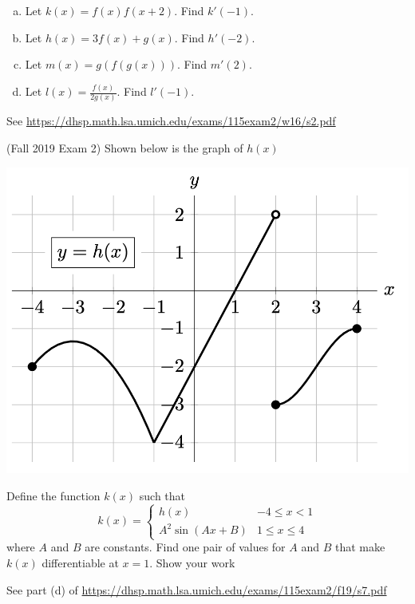 \documentclass[11pt]{exam}
\begin{document}
\begin{questions}
\begin{multicols}{2}
\begin{enumerate}[(a)]
	\item Let $k(x) = f(x)f(x+2)$. Find $k'(-1)$.
	\item Let $h(x) = 3f(x) + g(x)$. Find $h'(-2)$.
	\item Let $m(x) = g(f(g(x)))$. Find $m'(2)$.
	\item Let $l(x) = \frac{f(x)}{2g(x)}$. Find $l'(-1)$.
	\end{enumerate}
	\end{multicols}
        \begin{solution}
          See \href{https://dhsp.math.lsa.umich.edu/exams/115exam2/w16/s2.pdf}{https://dhsp.math.lsa.umich.edu/exams/115exam2/w16/s2.pdf}
        \end{solution}
      \question (Fall 2019 Exam 2) Shown below is the graph of \(h(x)\)
        \begin{center}
          \includegraphics[scale=0.4]{Figures/graphh2}
        \end{center}
        Define the function \(k(x)\) such that \[
          k(x) =
          \begin{cases}
            h(x) & -4 \leq x < 1 \\
            A^2 \sin(Ax+B) & 1 \leq x \leq 4
          \end{cases}
        \]
        where \(A\) and \(B\) are constants. Find one pair of values for \(A\) and \(B\) that make \(k(x)\) differentiable
        at \(x = 1\). Show your work
        \begin{solution}
          See part (d) of \href{https://dhsp.math.lsa.umich.edu/exams/115exam2/f19/s7.pdf}{https://dhsp.math.lsa.umich.edu/exams/115exam2/f19/s7.pdf}

\end{solution}
\end{questions}
\end{document}

